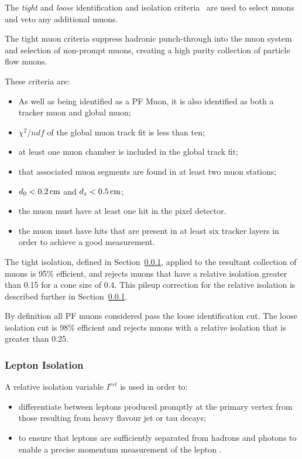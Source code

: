 The \emph{tight} and \emph{loose} identification and isolation criteria~\cite{Chatrchyan:2012xi} are used to select muons and veto any additional muons.

The tight muon criteria suppress hadronic punch-through into the muon system and selection of non-prompt muons, creating a high purity collection of particle flow muons.

These criteria are:
\begin{itemize}
\item As well as being identified as a PF Muon, it is also identified as both a tracker muon and global muon;
\item $\chi^{2}/ndf$ of the global muon track fit is less than ten;
\item at least one muon chamber is included in the global track fit;
\item that associated muon segments are found in at least two muon stations;
\item $d_{0} < 0.2\,\text{cm}$ and $d_{z} < 0.5\,\text{cm}$;
\item the muon must have at least one hit in the pixel detector.
\item the muon must have hits that are present in at least six tracker layers in order to achieve a good \pT measurement.
\end{itemize}

The tight isolation, defined in Section~\ref{subsubsec:relIso}, applied to the resultant collection of muons is 95\% efficient, and rejects muons that have a relative isolation greater than 0.15 for a cone size of 0.4.
This pileup correction for the relative isolation is described further in Section~\ref{subsubsec:relIso}.

By definition all PF muons considered pass the loose identification cut.
The loose isolation cut is 98\% efficient and rejects muons with a relative isolation that is greater than 0.25.

\subsubsection{Lepton Isolation}\label{subsubsec:relIso}
A relative isolation variable $I^{rel}$ is used in order to:
\begin{itemize}
\item differentiate between leptons produced promptly at the primary vertex from those resulting from heavy flavour jet or tau decays;
\item to ensure that leptons are sufficiently separated from hadrons and photons to enable a precise momentum measurement of the lepton .
\end{itemize}

